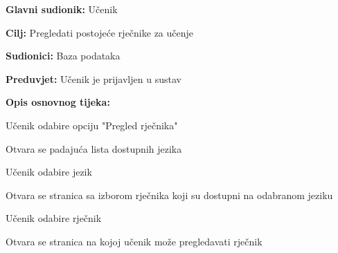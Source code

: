					\noindent {}
					\begin{packed_item}
	
						\item \textbf{Glavni sudionik: }Učenik
						\item  \textbf{Cilj:} Pregledati postojeće rječnike za učenje
						\item  \textbf{Sudionici:} Baza podataka
						\item  \textbf{Preduvjet:} Učenik je prijavljen u sustav
						\item  \textbf{Opis osnovnog tijeka:}
						
						\item[] \begin{packed_enum}
	
							\item Učenik odabire opciju "Pregled rječnika"
							\item Otvara se padajuća lista dostupnih jezika
							\item Učenik odabire jezik
							\item Otvara se stranica sa izborom rječnika koji su dostupni na odabranom jeziku
							\item Učenik odabire rječnik
							\item Otvara se stranica na kojoj učenik može pregledavati rječnik
						\end{packed_enum}
						
					\end{packed_item}

